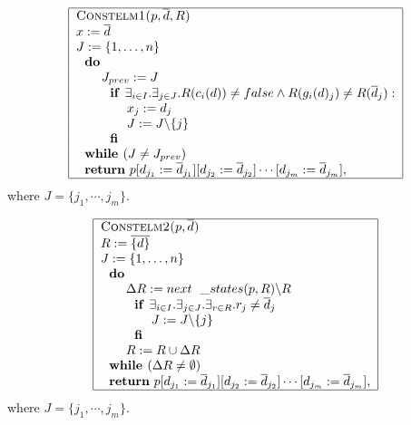 \documentclass{article}
\begin{document}
\[
\begin{tabular}{|l|}
\hline
\textsc{Constelm1(}$p,\overline{d},R$\textsc{)} \\
$x:=\overline{d}$ \\
$J:=\{1,\ldots ,n\}$ \\
$\text{\textbf{do}}$ \\
$\qquad J_{prev}:=J$ \\
$\qquad \text{\textbf{if }}\exists _{i\in I}.\exists _{j\in
J}.R(c_{i}(d))\neq false\wedge R(g_{i}(d)_{j})\neq R(\overline{d}_{j}):$ \\
$\qquad \qquad x_{j}:=d_{j}$ \\
$\qquad \qquad J:=J\backslash \{j\}$ \\
$\qquad \text{\textbf{fi}}$ \\
$\text{\textbf{while }}(J\neq J_{prev})$ \\
$\text{\textbf{return} }p[d_{j_{1}}:=\overline{d}_{j_{1}}][d_{j_{2}}:=%
\overline{d}_{j_{2}}]\cdots \lbrack d_{j_{m}}:=\overline{d}_{j_{m}}],$ \\
\hline
\end{tabular}%
\]%
where $J=\{j_{1},\cdots ,j_{m}\}$.

\[
\begin{tabular}{|l|}
\hline
\textsc{Constelm2(}$p,\overline{d}$\textsc{)} \\
$R:=\overline{\{d\}}$ \\
$J:=\{1,\ldots ,n\}$ \\
$\text{\textbf{do}}$ \\
$\qquad \Delta R:=next\_states(p,R)\backslash R$ \\
$\qquad \text{\textbf{if }}\exists _{i\in I}.\exists _{j\in J}.\exists
_{r\in R}.r_{j}\neq \overline{d}_{j}$ \\
$\qquad \qquad J:=J\backslash \{j\}$ \\
$\qquad \text{\textbf{fi}}$ \\
$\qquad R:=R\cup \Delta R$ \\
$\text{\textbf{while }}(\Delta R\neq \emptyset )$ \\
$\text{\textbf{return} }p[d_{j_{1}}:=\overline{d}_{j_{1}}][d_{j_{2}}:=%
\overline{d}_{j_{2}}]\cdots \lbrack d_{j_{m}}:=\overline{d}_{j_{m}}],$ \\
\hline
\end{tabular}%
\]%
where $J=\{j_{1},\cdots ,j_{m}\}$.
\end{document}
